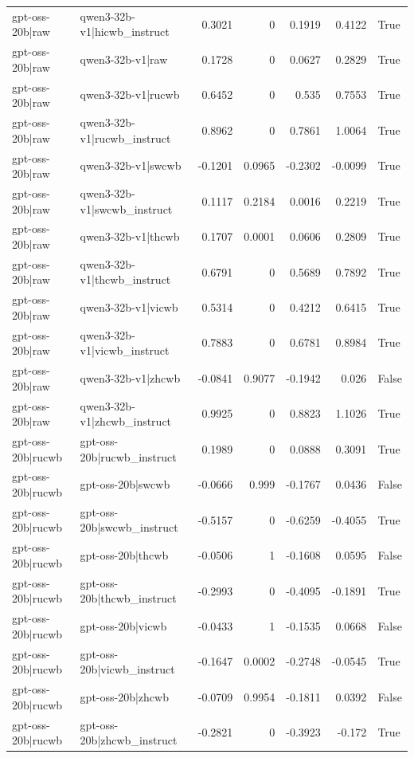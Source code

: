 \begin{table}
\begin{tabular}{l l r r r r l}
gpt-oss-20b|raw & qwen3-32b-v1|hicwb_instruct & 0.3021 & 0 & 0.1919 & 0.4122 & True \\
gpt-oss-20b|raw & qwen3-32b-v1|raw & 0.1728 & 0 & 0.0627 & 0.2829 & True \\
gpt-oss-20b|raw & qwen3-32b-v1|rucwb & 0.6452 & 0 & 0.535 & 0.7553 & True \\
gpt-oss-20b|raw & qwen3-32b-v1|rucwb_instruct & 0.8962 & 0 & 0.7861 & 1.0064 & True \\
gpt-oss-20b|raw & qwen3-32b-v1|swcwb & -0.1201 & 0.0965 & -0.2302 & -0.0099 & True \\
gpt-oss-20b|raw & qwen3-32b-v1|swcwb_instruct & 0.1117 & 0.2184 & 0.0016 & 0.2219 & True \\
gpt-oss-20b|raw & qwen3-32b-v1|thcwb & 0.1707 & 0.0001 & 0.0606 & 0.2809 & True \\
gpt-oss-20b|raw & qwen3-32b-v1|thcwb_instruct & 0.6791 & 0 & 0.5689 & 0.7892 & True \\
gpt-oss-20b|raw & qwen3-32b-v1|vicwb & 0.5314 & 0 & 0.4212 & 0.6415 & True \\
gpt-oss-20b|raw & qwen3-32b-v1|vicwb_instruct & 0.7883 & 0 & 0.6781 & 0.8984 & True \\
gpt-oss-20b|raw & qwen3-32b-v1|zhcwb & -0.0841 & 0.9077 & -0.1942 & 0.026 & False \\
gpt-oss-20b|raw & qwen3-32b-v1|zhcwb_instruct & 0.9925 & 0 & 0.8823 & 1.1026 & True \\
gpt-oss-20b|rucwb & gpt-oss-20b|rucwb_instruct & 0.1989 & 0 & 0.0888 & 0.3091 & True \\
gpt-oss-20b|rucwb & gpt-oss-20b|swcwb & -0.0666 & 0.999 & -0.1767 & 0.0436 & False \\
gpt-oss-20b|rucwb & gpt-oss-20b|swcwb_instruct & -0.5157 & 0 & -0.6259 & -0.4055 & True \\
gpt-oss-20b|rucwb & gpt-oss-20b|thcwb & -0.0506 & 1 & -0.1608 & 0.0595 & False \\
gpt-oss-20b|rucwb & gpt-oss-20b|thcwb_instruct & -0.2993 & 0 & -0.4095 & -0.1891 & True \\
gpt-oss-20b|rucwb & gpt-oss-20b|vicwb & -0.0433 & 1 & -0.1535 & 0.0668 & False \\
gpt-oss-20b|rucwb & gpt-oss-20b|vicwb_instruct & -0.1647 & 0.0002 & -0.2748 & -0.0545 & True \\
gpt-oss-20b|rucwb & gpt-oss-20b|zhcwb & -0.0709 & 0.9954 & -0.1811 & 0.0392 & False \\
gpt-oss-20b|rucwb & gpt-oss-20b|zhcwb_instruct & -0.2821 & 0 & -0.3923 & -0.172 & True \\

\end{tabular}
\end{table}
